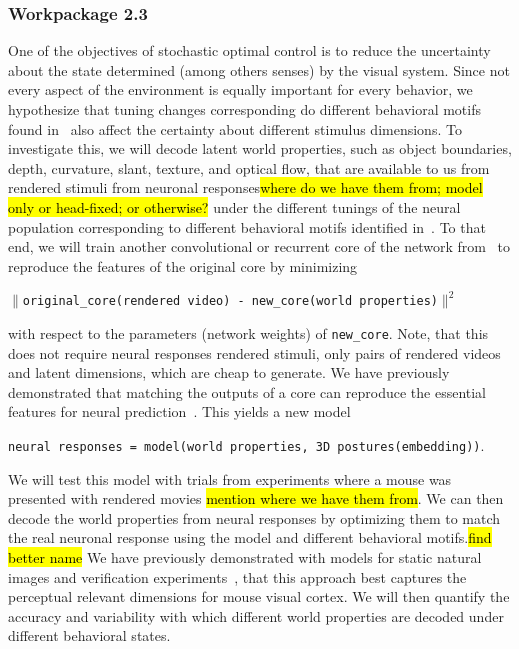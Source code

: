 \documentclass[B2,COG]{ercgrant}
\begin{document}
\subsubsection{Workpackage 2.3\hfill {}}

One of the objectives of stochastic optimal control is to reduce the uncertainty about the state determined (among others senses) by the visual system. 
Since not every aspect of the environment is equally important for every behavior, we hypothesize that tuning changes corresponding do different behavioral motifs found in~ also affect the certainty about different stimulus dimensions. 
To investigate this, we will decode latent world properties, such as object boundaries, depth, curvature, slant, texture, and optical flow, that are available to us from rendered stimuli from neuronal responses\hl{where do we have them from; model only or head-fixed; or otherwise?} under the different tunings of the neural population corresponding to different behavioral motifs identified in~.
To that end, we will train another convolutional or recurrent core of the network from~ to reproduce the features of the original core by minimizing
\begin{center}
    \texttt{$\|$original\_core(rendered video) - new\_core(world properties)$\|^2$}
\end{center}
with respect to the parameters (network weights) of \texttt{new\_core}. 
Note, that this does not require neural responses rendered stimuli, only pairs of rendered videos and latent dimensions, which are cheap to generate. 
We have previously demonstrated that matching the outputs of a core can reproduce the essential features for neural prediction~\parencite{Safarani2021-yy}.
This yields a new model 
\begin{center}
    \texttt{neural responses = model(world properties, 3D postures(embedding))}.
\end{center}
We will test this model with trials from experiments where a mouse was presented with rendered movies \hl{mention where we have them from}. 
We can then decode the world properties from neural responses by optimizing them to match the real neuronal response using the model and different behavioral motifs.\hl{find better name} 
We have previously demonstrated with models for static natural images and verification experiments~\parencite{Cobos2022-rr}, that this approach best captures the perceptual relevant dimensions for mouse visual cortex. 
We will then quantify the accuracy and variability with which different world properties are decoded under different behavioral states. 
\end{document}
